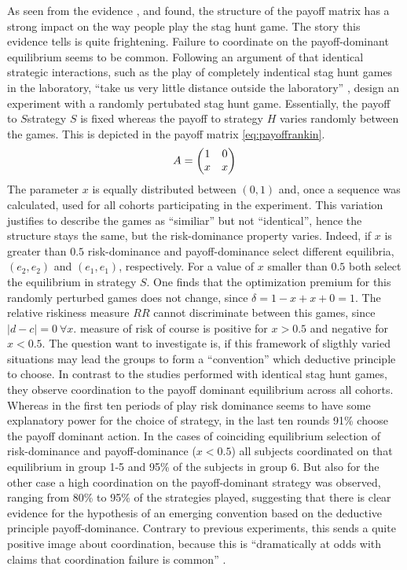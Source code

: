 As seen from the evidence \textcite{battalio_optimization_2001},
\textcite{schmidt_playing_2003} and \textcite{dubois_optimization_2012} 
found, the structure of the payoff matrix has a strong impact on the way 
people play the stag hunt game.   
The story this evidence tells is quite frightening. Failure to coordinate 
on the payoff-dominant equilibrium seems to be common. 
Following an argument of \textcite{kreps_game_1990} that identical strategic 
interactions, such as the play of completely indentical stag hunt games 
in the laboratory, ``take us very little distance outside the laboratory'' 
\parencite[212]{kreps_game_1990}, 
\textcite{rankin_strategic_2000} design an experiment with a randomly 
pertubated stag hunt game. Essentially, the payoff to $S$strategy $S$ is fixed 
whereas the payoff to strategy $H$ varies randomly between the games. This is
depicted in the payoff matrix \eqref{eq:payoffrankin}.
\begin{align}
        \label{eq:payoffrankin}
        A = \mqty(1 & 0 \\ x & x)
\end{align}        
The parameter $x$ is equally distributed between $(0,1)$ and, once a sequence
was calculated, used for all cohorts participating in the experiment. This
variation justifies to describe the games as ``similiar'' but not
``identical'', hence the structure stays the same, but the risk-dominance 
property varies. Indeed, if $x$ is greater than $0.5$ risk-dominance and
payoff-dominance select different equilibria, $(e_2,e_2)$ and $(e_1,e_1)$,
respectively. For a value of $x$ smaller than $0.5$ both select 
the equilibrium in strategy $S$. One finds that the optimization premium for 
this randomly perturbed games does not change, since $\delta=1-x+x+0=1$. 
The relative riskiness measure $RR$ cannot discriminate between this games,
since $|d-c|=0\ \forall x$. \textcite{schmidt_playing_2003} measure of risk of 
course is positive for $x > 0.5$ and negative for $x <0.5$. 
The question \textcite{rankin_strategic_2000}
want to investigate is, if this framework of sligthly varied situations may
lead the groups to form a ``convention'' which deductive principle to choose. 
In contrast to the studies performed with identical stag hunt games, they 
observe coordination to the payoff dominant equilibrium across
all cohorts. Whereas in the first ten periods of play risk dominance seems
to have some explanatory power for the choice of strategy, in the last ten
rounds 91\% choose the payoff dominant action. 
In the cases of coinciding equilibrium selection of risk-dominance and 
payoff-dominance ($x < 0.5$) all subjects coordinated on that equilibrium in 
group 1-5 and 95\% of the subjects in group 6. But also for the other case a 
high coordination on the payoff-dominant strategy was observed, ranging from 
80\% to 95\% of the strategies played, suggesting that there is clear evidence
for the hypothesis of an emerging convention based on the deductive principle
payoff-dominance. Contrary to previous experiments, this sends 
a quite positive image about coordination, because 
this is ``dramatically at odds with claims that coordination failure is common''
\parencite[9]{devetag_when_2007}. 

